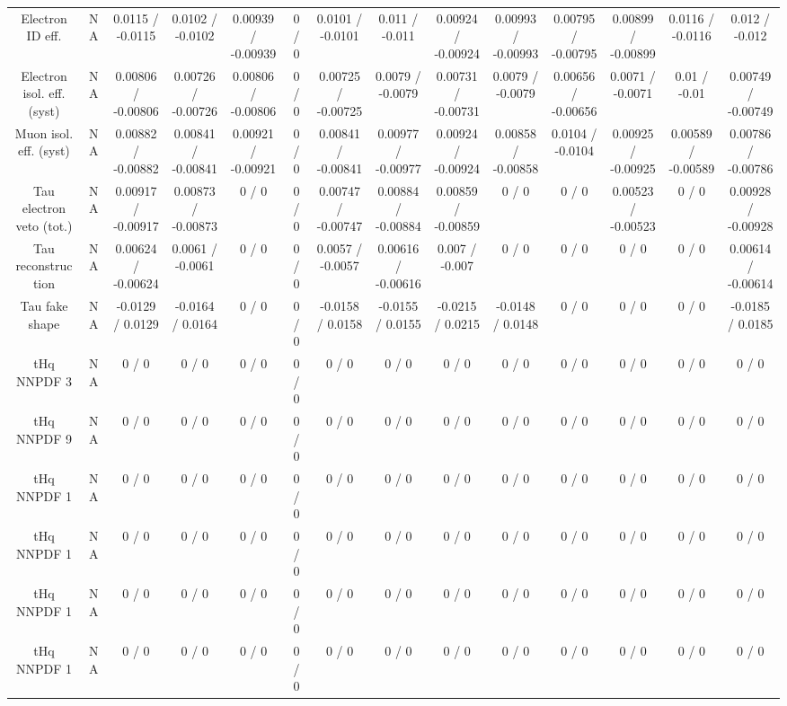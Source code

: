 \documentclass[10pt]{article}
\begin{document}
\begin{table}[htbp]
\begin{center}
\begin{tabular}{|c|c|c|c|c|c|c|c|c|c|c|c|c|c|}
  Electron ID eff. &    NA    & 0.0115 / -0.0115 & 0.0102 / -0.0102 & 0.00939 / -0.00939 & 0 / 0 & 0.0101 / -0.0101 & 0.011 / -0.011 & 0.00924 / -0.00924 & 0.00993 / -0.00993 & 0.00795 / -0.00795 & 0.00899 / -0.00899 & 0.0116 / -0.0116 & 0.012 / -0.012 \\ 
  Electron isol. eff. (syst) &    NA    & 0.00806 / -0.00806 & 0.00726 / -0.00726 & 0.00806 / -0.00806 & 0 / 0 & 0.00725 / -0.00725 & 0.0079 / -0.0079 & 0.00731 / -0.00731 & 0.0079 / -0.0079 & 0.00656 / -0.00656 & 0.0071 / -0.0071 & 0.01 / -0.01 & 0.00749 / -0.00749 \\ 
  Muon isol. eff. (syst) &    NA    & 0.00882 / -0.00882 & 0.00841 / -0.00841 & 0.00921 / -0.00921 & 0 / 0 & 0.00841 / -0.00841 & 0.00977 / -0.00977 & 0.00924 / -0.00924 & 0.00858 / -0.00858 & 0.0104 / -0.0104 & 0.00925 / -0.00925 & 0.00589 / -0.00589 & 0.00786 / -0.00786 \\ 
  Tau electron veto (tot.) &    NA    & 0.00917 / -0.00917 & 0.00873 / -0.00873 & 0 / 0 & 0 / 0 & 0.00747 / -0.00747 & 0.00884 / -0.00884 & 0.00859 / -0.00859 & 0 / 0 & 0 / 0 & 0.00523 / -0.00523 & 0 / 0 & 0.00928 / -0.00928 \\ 
  Tau reconstruction &    NA    & 0.00624 / -0.00624 & 0.0061 / -0.0061 & 0 / 0 & 0 / 0 & 0.0057 / -0.0057 & 0.00616 / -0.00616 & 0.007 / -0.007 & 0 / 0 & 0 / 0 & 0 / 0 & 0 / 0 & 0.00614 / -0.00614 \\ 
  Tau fake shape &    NA    & -0.0129 / 0.0129 & -0.0164 / 0.0164 & 0 / 0 & 0 / 0 & -0.0158 / 0.0158 & -0.0155 / 0.0155 & -0.0215 / 0.0215 & -0.0148 / 0.0148 & 0 / 0 & 0 / 0 & 0 / 0 & -0.0185 / 0.0185 \\ 
  tHq NNPDF 3 &    NA    & 0 / 0 & 0 / 0 & 0 / 0 & 0 / 0 & 0 / 0 & 0 / 0 & 0 / 0 & 0 / 0 & 0 / 0 & 0 / 0 & 0 / 0 & 0 / 0 \\ 
  tHq NNPDF 9 &    NA    & 0 / 0 & 0 / 0 & 0 / 0 & 0 / 0 & 0 / 0 & 0 / 0 & 0 / 0 & 0 / 0 & 0 / 0 & 0 / 0 & 0 / 0 & 0 / 0 \\ 
  tHq NNPDF 1 &    NA    & 0 / 0 & 0 / 0 & 0 / 0 & 0 / 0 & 0 / 0 & 0 / 0 & 0 / 0 & 0 / 0 & 0 / 0 & 0 / 0 & 0 / 0 & 0 / 0 \\ 
  tHq NNPDF 1 &    NA    & 0 / 0 & 0 / 0 & 0 / 0 & 0 / 0 & 0 / 0 & 0 / 0 & 0 / 0 & 0 / 0 & 0 / 0 & 0 / 0 & 0 / 0 & 0 / 0 \\ 
  tHq NNPDF 1 &    NA    & 0 / 0 & 0 / 0 & 0 / 0 & 0 / 0 & 0 / 0 & 0 / 0 & 0 / 0 & 0 / 0 & 0 / 0 & 0 / 0 & 0 / 0 & 0 / 0 \\ 
  tHq NNPDF 1 &    NA    & 0 / 0 & 0 / 0 & 0 / 0 & 0 / 0 & 0 / 0 & 0 / 0 & 0 / 0 & 0 / 0 & 0 / 0 & 0 / 0 & 0 / 0 & 0 / 0 \\ 

\end{tabular}
\end{center}
\end{table}
\end{document}
